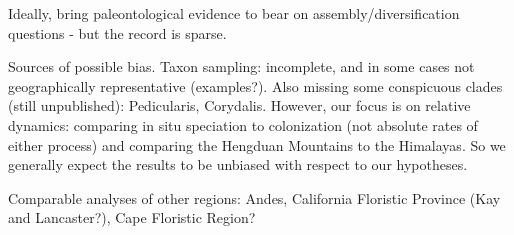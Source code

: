 Ideally, bring paleontological evidence to bear on assembly/diversification questions - but the record is sparse.

Sources of possible bias. Taxon sampling: incomplete, and in some cases not geographically representative (examples?). Also missing some conspicuous clades (still unpublished): Pedicularis, Corydalis. However, our focus is on relative dynamics: comparing in situ speciation to colonization (not absolute rates of either process) and comparing the Hengduan Mountains to the Himalayas. So we generally expect the results to be unbiased with respect to our hypotheses.

Comparable analyses of other regions: Andes, California Floristic Province (Kay and Lancaster?), Cape Floristic Region?

